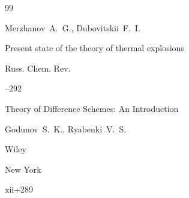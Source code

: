 \begin{thebibliography}{99}

\by Merzhanov~A.~G., Dubovitskii~F.~I.

\paper Present state of the theory of thermal explosions

\jour Russ. Chem. Rev.




–292 






\book Theory of Difference Schemes: An Introduction

\by Godunov~S.~K., Ryabenki~V.~S.

\publ Wiley

\publaddr New York


\totalpages xii+289 







\end{thebibliography}







\renewcommand{\baselinestretch}{0.9}



\newpage



%


